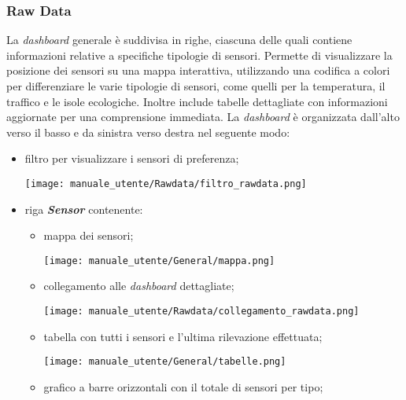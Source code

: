 \subsubsection{Raw Data}
La \textit{dashboard} generale è suddivisa in righe, ciascuna delle quali contiene informazioni relative a specifiche tipologie di sensori. Permette di visualizzare la posizione dei sensori su una mappa interattiva, utilizzando una codifica a colori per differenziare le varie tipologie di sensori, come quelli per la temperatura, il traffico e le isole ecologiche. Inoltre include tabelle dettagliate con informazioni aggiornate per una comprensione immediata. La \textit{dashboard} è organizzata dall'alto verso il basso e da sinistra verso destra nel seguente modo:
\begin{itemize}
    \item filtro per visualizzare i sensori di preferenza;
    \begin{center}
        \texttt{[image: manuale\_utente/Rawdata/filtro\_rawdata.png]}
    \end{center} 
    \item riga \textit{\textbf{Sensor}} contenente:
    \begin{itemize}
        \item mappa dei sensori;
        \begin{center}
            \texttt{[image: manuale\_utente/General/mappa.png]}
        \end{center} 
        \item collegamento alle \textit{dashboard} dettagliate;
        \begin{center}
            \texttt{[image: manuale\_utente/Rawdata/collegamento\_rawdata.png]}
        \end{center} 
        \item tabella con tutti i sensori e l'ultima rilevazione effettuata;
        \begin{center}
            \texttt{[image: manuale\_utente/General/tabelle.png]}
        \end{center} 
        \item grafico a barre orizzontali con il totale di sensori per tipo;
        \begin{center}

\end{center}
\end{itemize}
\end{itemize}
